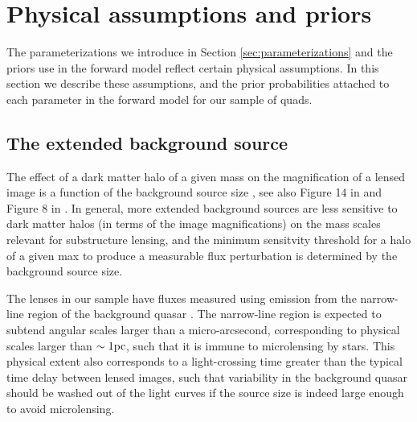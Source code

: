 \begin{table}
{}
\end{table}

\section{Physical assumptions and priors}
\label{sec:assumptionsandpriors}
The parameterizations we introduce in Section \ref{sec:parameterizations} and the priors use in the forward model reflect certain physical assumptions. In this section we describe these assumptions, and the prior probabilities attached to each parameter in the forward model for our sample of quads. 

\subsection{The extended background source}
\label{ssec:srcassumptions}
The effect of a dark matter halo of a given mass on the magnification of a lensed image is a function of the background source size \citep{DoblerKeeton02}, see also Figure 14 in \citet{Amara++06} and Figure 8 in \citet{Xu++12}. In general, more extended background sources are less sensitive to dark matter halos (in terms of the image magnifications) on the mass scales relevant for substructure lensing, and the minimum sensitvity threshold for a halo of a given max to produce a measurable flux perturbation is determined by the background source size. 

The lenses in our sample have fluxes measured using emission from the narrow-line region of the background quasar \citep{Nierenberg++17, Nierenberg++19}. The narrow-line region is expected to subtend angular scales larger than a micro-arcsecond, corresponding to physical scales larger than $\sim 1 \rm{pc}$, such that it is immune to microlensing by stars. This physical extent also corresponds to a light-crossing time greater than the typical time delay between lensed images, such that variability in the background quasar should be washed out of the light curves if the source size is indeed large enough to avoid microlensing. 

